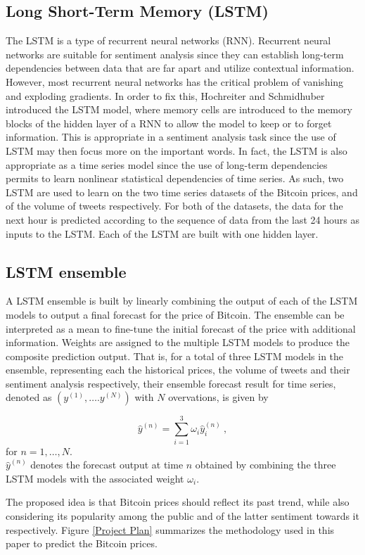 \documentclass[conference]{IEEEtran}
\begin{document}
\subsection{Long Short-Term Memory (LSTM)}
\par The LSTM is a type of recurrent neural networks (RNN). Recurrent neural networks are suitable for sentiment analysis since they can establish long-term dependencies between data that are far apart and utilize contextual information. However, most recurrent neural networks has the critical problem of vanishing and exploding gradients. In order to fix this, Hochreiter and Schmidhuber \cite{LSTM} introduced the LSTM model, where memory cells are introduced to the memory blocks of the hidden layer of a RNN to allow the model to keep or to forget information. This is appropriate in a sentiment analysis task since the use of LSTM may then focus more on the important words. In fact, the LSTM is also appropriate as a time series model since the use of long-term dependencies permits to learn nonlinear statistical dependencies of time series. As such, two LSTM are used to learn on the two time series datasets of the Bitcoin prices, and of the volume of tweets respectively. For both of the datasets, the data for the next hour is predicted according to the sequence of data from the last 24 hours as inputs to the LSTM. Each of the LSTM are built with one hidden layer.

\subsection{LSTM ensemble}
\par A LSTM ensemble is built by linearly combining the output of each of the LSTM models to output a final forecast for the price of Bitcoin. The ensemble can be interpreted as a mean to fine-tune the initial forecast of the price with additional information. Weights are assigned to the multiple LSTM models to produce the composite prediction output. That is, for a total of three LSTM models in the ensemble, representing each the historical prices, the volume of tweets and their sentiment analysis respectively, their ensemble forecast result for time series, denoted as $(y^{(1)}, \dots. y^{(N)})$ with $N$ overvations, is given by 

\begin{equation}
\label{LSTM ensemble weights}
\hat{y}^{(n)} = \sum_{i = 1}^{3} \omega_{i} \hat{y}_{i}^{(n)} ~, 
\end{equation} 
for $n = 1, \dots, N$.\\
$\hat{y}^{(n)}$ denotes the forecast output at time $n$ obtained by combining the three LSTM models with the associated weight $\omega_{i}$.
\par The proposed idea is that Bitcoin prices should reflect its past trend, while also considering its popularity among the public and of the latter sentiment towards it respectively. Figure \ref{Project Plan} summarizes the methodology used in this paper to predict the Bitcoin prices.
\end{document}
